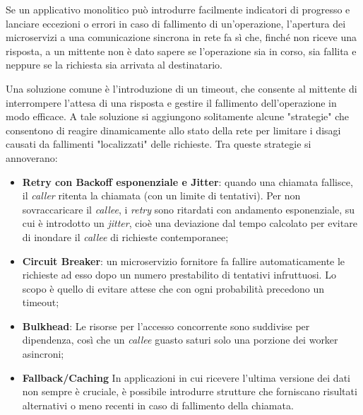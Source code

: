 Se un applicativo monolitico può introdurre facilmente indicatori di progresso e lanciare eccezioni o errori in caso di fallimento di un'operazione, l'apertura dei microservizi a una comunicazione sincrona in rete fa sì che, finché non riceve una risposta, a un mittente non è dato sapere se l'operazione sia in corso, sia fallita e neppure se la richiesta sia arrivata al destinatario.

Una soluzione comune è l'introduzione di un timeout, che consente al mittente di interrompere l'attesa di una risposta e gestire il fallimento dell'operazione in modo efficace.
A tale soluzione si aggiungono solitamente alcune "strategie" \cite{Thesis_microservices} che consentono di reagire dinamicamente allo stato della rete per limitare i disagi causati da fallimenti "localizzati" delle richieste.
Tra queste strategie si annoverano:
\begin{itemize}
  \item \textbf{Retry con Backoff esponenziale e Jitter}: quando una chiamata fallisce, il \emph{caller} ritenta la chiamata (con un limite di tentativi). Per non sovraccaricare il \emph{callee}, i \emph{retry} sono ritardati con andamento esponenziale, su cui è introdotto un \emph{jitter}, cioè una deviazione dal tempo calcolato per evitare di inondare il \emph{callee} di richieste contemporanee;
  \item \textbf{Circuit Breaker}: un microservizio fornitore fa fallire automaticamente le richieste ad esso dopo un numero prestabilito di tentativi infruttuosi. Lo scopo è quello di evitare attese che con ogni probabilità precedono un timeout;
  \item \textbf{Bulkhead}: Le risorse per l'accesso concorrente sono suddivise per dipendenza, così che un \emph{callee} guasto saturi solo una porzione dei worker asincroni;
  \item \textbf{Fallback/Caching} In applicazioni in cui ricevere l'ultima versione dei dati non sempre è cruciale, è possibile introdurre strutture che forniscano risultati alternativi o meno recenti in caso di fallimento della chiamata.
\end{itemize}


